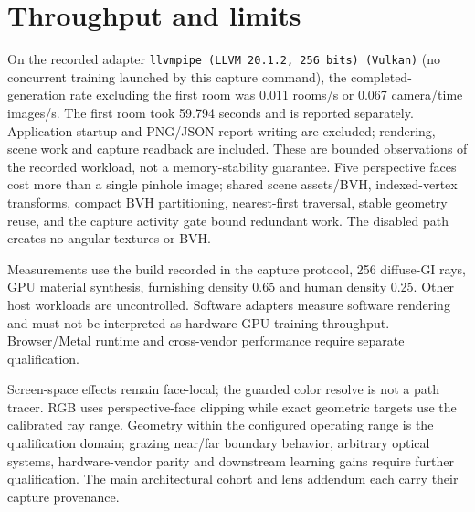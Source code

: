 \documentclass{article}
\begin{document}
\section{Throughput and limits}
On the recorded adapter \texttt{llvmpipe (LLVM 20.1.2, 256 bits) (Vulkan)} (no concurrent training launched by this capture command), the completed-generation rate excluding the first room was 0.011 rooms/s or 0.067 camera/time images/s. The first room took 59.794 seconds and is reported separately. Application startup and PNG/JSON report writing are excluded; rendering, scene work and capture readback are included. These are bounded observations of the recorded workload, not a memory-stability guarantee. Five perspective faces cost more than a single pinhole image; shared scene assets/BVH, indexed-vertex transforms, compact BVH partitioning, nearest-first traversal, stable geometry reuse, and the capture activity gate bound redundant work. The disabled path creates no angular textures or BVH.

Measurements use the build recorded in the capture protocol, 256 diffuse-GI rays, GPU material synthesis, furnishing density 0.65 and human density 0.25. Other host workloads are uncontrolled. Software adapters measure software rendering and must not be interpreted as hardware GPU training throughput. Browser/Metal runtime and cross-vendor performance require separate qualification.

Screen-space effects remain face-local; the guarded color resolve is not a path tracer. RGB uses perspective-face clipping while exact geometric targets use the calibrated ray range. Geometry within the configured operating range is the qualification domain; grazing near/far boundary behavior, arbitrary optical systems, hardware-vendor parity and downstream learning gains require further qualification. The main architectural cohort and lens addendum each carry their capture provenance.
\end{document}
